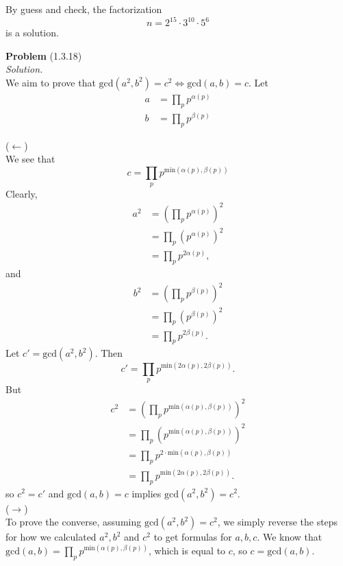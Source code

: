 \documentclass[12 pt]{amsart}
\begin{document}
  By guess and check, the factorization 
  \[
    n = 2^{15} \cdot 3^{10} \cdot 5^{6}
  \]
  is a solution.
\vfill
\newpage



\phantom{\quad} \vfill
\noindent
\textbf{Problem} (1.3.18) \\[4ex]
\emph{Solution.} \\[2ex]
  We aim to prove that 
  $\text{gcd}(a^2, b^2) = c^2 \iff \text{gcd}(a,b) = c$.
  Let 
  \begin{align*} 
    a &= \prod_p p^{\alpha(p)} \\
    b &= \prod_p p^{\beta(p)}
  \end{align*} 

  \noindent
  ($\longleftarrow$) \\
  We see that 
  \[
    c = \prod_p p^{\text{min}(\alpha(p), \beta(p))}
  \]
  Clearly,
  \begin{align*}
    a^2 &= \left( \prod_p p^{\alpha(p)} \right)^2 \\
        &= \prod_p \left( p^{\alpha(p)} \right)^2 \\
        &= \prod_p p^{2\alpha(p)},
  \end{align*}
  and 
  \begin{align*}
    b^2 &= \left( \prod_p p^{\beta(p)} \right)^2 \\
        &= \prod_p \left( p^{\beta(p)} \right)^2 \\
        &= \prod_p p^{2\beta(p)}.
  \end{align*}
  Let $c' = \text{gcd}(a^2, b^2)$.
  Then 
  \[
    c' = \prod_p p^{\text{min}(2\alpha(p), 2\beta(p))}.
  \]
  But 
  \begin{align*}
    c^2 &= \left( \prod_p p^{\text{min}(\alpha(p), \beta(p))} \right)^2 \\
        &= \prod_p \left( p^{\text{min}(\alpha(p), \beta(p))} \right)^2 \\
        &= \prod_p p^{2 \cdot \text{min}(\alpha(p), \beta(p))} \\
        &= \prod_p p^{\text{min}(2\alpha(p), 2\beta(p))}.
  \end{align*}
  so $c^2 = c'$ and $\text{gcd}(a,b) = c$ implies $\text{gcd}(a^2,b^2) = c^2$. \\

  \noindent
  ($\longrightarrow$) \\
  To prove the converse, 
  assuming $\text{gcd}(a^2,b^2) = c^2$,
  we simply reverse the steps for how we
  calculated $a^2, b^2$ and $c^2$ to get formulas for $a,b,c$.
  We know that $\text{gcd}(a,b) = \prod_p p^{\text{min}(\alpha(p), \beta(p))}$, 
  which is equal to $c$, so $c = \text{gcd}(a,b)$.
  
\end{document}
